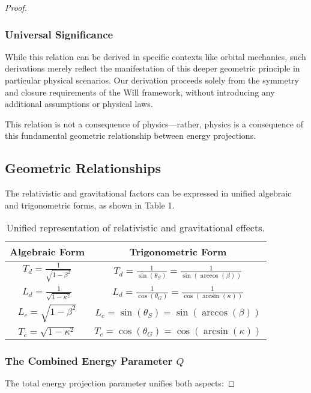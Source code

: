 \documentclass{article}
\begin{document}
\begin{theorem}
\begin{proof}
\subsubsection{Universal Significance}

While this relation can be derived in specific contexts like orbital mechanics, such derivations merely reflect the manifestation of this deeper geometric principle in particular physical scenarios. Our derivation proceeds solely from the symmetry and closure requirements of the Will framework, without introducing any additional assumptions or physical laws.

This relation is not a consequence of physics—rather, physics is a consequence of this fundamental geometric relationship between energy projections.

\subsection{Geometric Relationships}

The relativistic and gravitational factors can be expressed in unified algebraic and trigonometric forms, as shown in Table 1.

\begin{table}[h]
\centering
\begin{tabular}{|c|c|}
\hline
\textbf{Algebraic Form} & \textbf{Trigonometric Form} \\
\hline
$T_d = \frac{1}{\sqrt{1-\beta^2}}$ & $T_d = \frac{1}{\sin(\theta_S)} = \frac{1}{\sin(\arccos(\beta))}$ \\
\hline
$L_d = \frac{1}{\sqrt{1-\kappa^2}}$ & $L_d = \frac{1}{\cos(\theta_G)} = \frac{1}{\cos(\arcsin(\kappa))}$ \\
\hline
$L_c = \sqrt{1-\beta^2}$ & $L_c = \sin(\theta_S) = \sin(\arccos(\beta))$ \\
\hline
$T_c = \sqrt{1-\kappa^2}$ & $T_c = \cos(\theta_G) = \cos(\arcsin(\kappa))$ \\
\hline
\end{tabular}
\caption{Unified representation of relativistic and gravitational effects.}
\end{table}

\subsubsection{The Combined Energy Parameter $Q$}

The total energy projection parameter unifies both aspects:


\end{proof}
\end{theorem}
\end{document}
